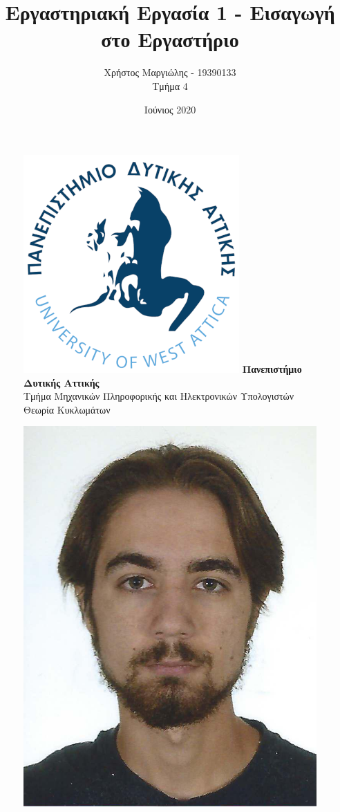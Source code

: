 \documentclass{article}
\title{Εργαστηριακή Εργασία 1 - Εισαγωγή στο Εργαστήριο}
\author{Χρήστος Μαργιώλης - 19390133 \\ Τμήμα 4}
\date{Ιούνιος 2020}
\begin{document}
\begin{figure}[t!]
    \centering
    \includegraphics[scale=0.3, center]{./res/Logo_University_of_West_Attica.png}
    \Large
    \textbf{Πανεπιστήμιο Δυτικής Αττικής} \\
    \large
    Τμήμα Μηχανικών Πληροφορικής και Ηλεκτρονικών Υπολογιστών \\
    Θεωρία Κυκλωμάτων
\end{figure}
\begin{figure}[b]
    \centering
    \includegraphics[scale=1]{./res/19390133.jpeg}
\end{figure}
\end{document}
